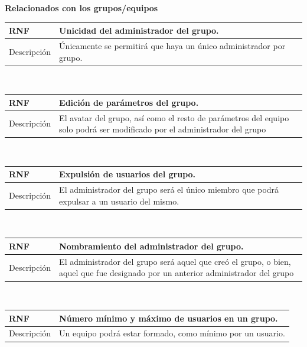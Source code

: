 \documentclass[twoside]{report}
\newcommand\addrow[2]{#1 &#2\\ }
\newcommand\addheading[2]{#1 &#2\\ \hline}
\newcommand\tabularhead{\begin{tabular}{lp{0.7\textwidth}}
\hline
}
\newenvironment{req}{\tabularhead}
{\hline\end{tabular}}
\begin{document}
\vspace{1cm}

\textbf{Relacionados con los grupos/equipos}\\

\begin{req}
	\addheading{\textbf{RNF\arabic{nonFunctionalRequirements}}}{Unicidad del administrador del grupo.}
	\addrow{Descripción}{Únicamente se permitirá que haya un único administrador por grupo.}
\end{req}\\

\vspace{0.25cm}

\begin{req}
	\addheading{\textbf{RNF\arabic{nonFunctionalRequirements}}}{Edición de parámetros del grupo.}
	\addrow{Descripción}{El avatar del grupo, así como el resto de parámetros del equipo solo podrá ser modificado por el administrador del grupo}
\end{req}\\

\vspace{0.25cm}

\begin{req}
	\addheading{\textbf{RNF\arabic{nonFunctionalRequirements}}}{Expulsión de usuarios del grupo.}
	\addrow{Descripción}{El administrador del grupo será el único miembro que podrá expulsar a un usuario del mismo.}
\end{req}\\

\vspace{0.25cm}

\begin{req}
	\addheading{\textbf{RNF\arabic{nonFunctionalRequirements}}}{Nombramiento del administrador del grupo.}
	\addrow{Descripción}{El administrador del grupo será aquel que creó el grupo, o bien, aquel que fue designado por un anterior administrador del grupo}
\end{req}\\

\vspace{0.25cm}

\begin{req}
	\addheading{\textbf{RNF\arabic{nonFunctionalRequirements}}}{Número mínimo y máximo de usuarios en un grupo.}
	\addrow{Descripción}{Un equipo podrá estar formado, como mínimo por un usuario.}
\end{req}\\
\end{document}
